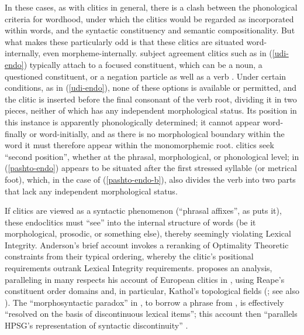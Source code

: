 \documentclass[output=paper,biblatex,babelshorthands,newtxmath,draftmode,colorlinks,citecolor=brown]{langscibook}
\begin{document}
\noindent
In these cases, as with clitics in general, there is a clash between the phonological criteria for wordhood, under which the clitics would be regarded as incorporated within words, and the syntactic constituency and semantic compositionality.
But what makes these particularly odd is that these clitics are situated word-internally, even morpheme-internally.
 subject agreement clitics such as  in (\ref{udi-endo}) typically attach to a focused constituent, which can be a noun, a questioned constituent, or a negation particle as well as a verb \citep{Harris2000}.
Under certain conditions, as in (\ref{udi-endo}), none of these options is available or permitted, and the clitic is inserted before the final consonant of the verb root, dividing it in two pieces, neither of which has any independent morphological status.
Its position in this instance is apparently phonologically determined; it cannot appear word-finally or word-initially, and as there is no morphological boundary within the word it must therefore appear within the monomorphemic root.
 clitics seek ``second position'', whether at the phrasal, morphological, or phonological level;  in (\ref{pashto-endo}) appears to be situated after the first stressed syllable (or metrical foot), which, in the case of (\ref{pashto-endo-b}), also divides the verb into two parts that lack any independent morphological status.

If clitics are viewed as a syntactic phenomenon (``phrasal affixes'', as \citealt{Anderson2005} puts
it), these endoclitics must ``see'' into the internal structure of words (be it morphological,
prosodic, or something else), thereby seemingly violating Lexical
Integrity. Anderson's brief account invokes a reranking of Optimality Theoretic constraints from
their typical ordering, whereby the clitic's positional requirements outrank Lexical Integrity
requirements. \citet{Crysmann2000b} proposes an analysis, paralleling in many respects his account
of European  clitics in \citet{Crysmann2000a}, using Reape's constituent
order domains \citep{Reape1994} and, in particular, Kathol's topological
fields
(\citealt{Kathol2000a}; see also ). The ``morphosyntactic paradox'' in , to borrow
a phrase from \citet[]{Crysmann2003d}, is effectively ``resolved on the basis of discontinuous lexical items''; this account then ``parallels HPSG's representation of syntactic discontinuity'' \citep{Crysmann2000b}.
\end{document}

